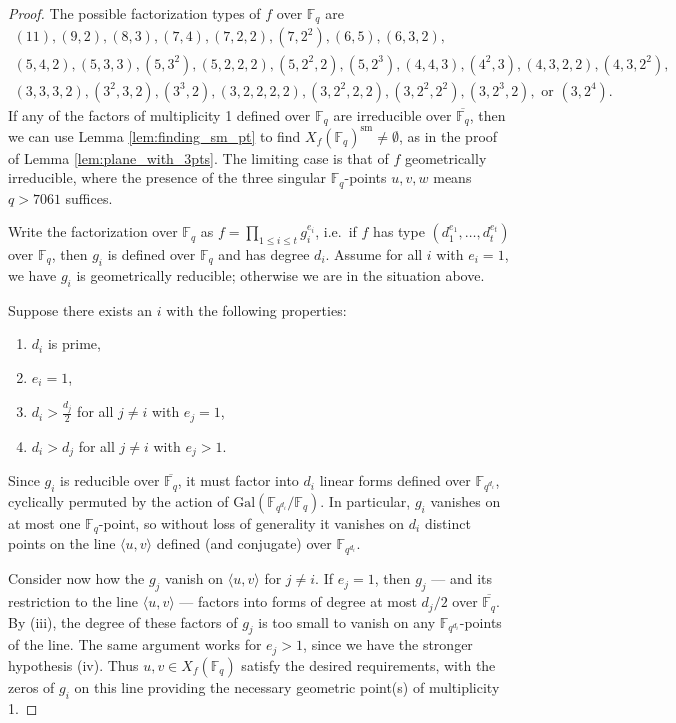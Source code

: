 \documentclass{amsart}
\newcommand{\F}{\mathbb{F}}
\newcommand{\Span}[1]{\langle #1 \rangle}
\newcommand{\sm}{\mathrm{sm}}
\theoremstyle{definition}
\numberwithin{equation}{section}
\numberwithin{table}{section}
\newcommand{\qbound}[1]{{\color{cyan}$q > {#1}$}}
\renewcommand{\qbound}[1]{{$q > {#1}$}}
\begin{document}
\begin{proof}
    The possible factorization types of $f$ over $\F_q$ are
    \begin{align*}
        (11), (9,2), (8,3), 
        (7,4), (7,2,2), (7,2^2), 
        (6,5), (6,3,2), \\
        (5,4,2), (5,3,3), (5,3^2), (5,2,2,2), (5,2^2,2), (5,2^3),
        (4,4,3), (4^2,3), (4,3,2,2), (4,3,2^2),\\
        (3,3,3,2), (3^2,3,2), (3^3,2), (3,2,2,2,2), (3,2^2,2,2), (3,2^2,2^2), (3,2^3,2), \text{ or } (3,2^4).
    \end{align*}
    If any of the factors of multiplicity 1 defined over $\F_q$ are irreducible over $\overline{\F_q}$, then we can use Lemma \ref{lem:finding_sm_pt} to find $X_f(\F_q)^\sm \neq \emptyset$, as in the proof of Lemma \ref{lem:plane_with_3pts}. The limiting case is that of $f$ geometrically irreducible, where the presence of the three singular $\F_q$-points $u,v,w$ means \qbound{7061} suffices.

    Write the factorization over $\F_q$ as $f = \prod_{1 \leq i \leq t} g_i^{e_i}$, i.e.\ if $f$ has type $(d_1^{e_1},\ldots,d_t^{e_t})$ over $\F_q$, then $g_i$ is defined over $\F_q$ and has degree $d_i$. Assume for all $i$ with $e_i = 1$, we have $g_i$ is geometrically reducible; otherwise we are in the situation above.
    
    Suppose there exists an $i$ with the following properties:
    \begin{enumerate}[label = (\roman*)]
        \item $d_i$ is prime,
        \item $e_i = 1$,
        \item $d_i > \frac{d_j}{2}$ for all $j \neq i$ with $e_j = 1$,
        \item $d_i > d_j$ for all $j \neq i$ with $e_j > 1$.
    \end{enumerate}
    Since $g_i$ is reducible over $\overline{\F_q}$, it must factor into $d_i$ linear forms defined over $\F_{q^{d_i}}$, cyclically permuted by the action of $\mathrm{Gal}(\F_{q^{d_i}}/\F_q)$. In particular, $g_i$ vanishes on at most one $\F_q$-point, so without loss of generality it vanishes on $d_i$ distinct points on the line $\Span{u,v}$ defined (and conjugate) over $\F_{q^{d_i}}$.

    Consider now how the $g_j$ vanish on $\Span{u,v}$ for $j \neq i$. If $e_j = 1$, then $g_j$ --- and its restriction to the line $\Span{u,v}$ --- factors into forms of degree at most $d_j/2$ over $\overline{\F_q}$. By (iii), the degree of these factors of $g_j$ is too small to vanish on any $\F_{q^{d_i}}$-points of the line. The same argument works for $e_j > 1$, since we have the stronger hypothesis (iv). Thus $u,v \in X_f(\F_q)$ satisfy the desired requirements, with the zeros of $g_i$ on this line providing the necessary geometric point(s) of multiplicity 1. 


\end{proof}
\end{document}
